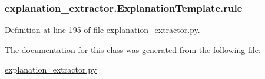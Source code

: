 \subsubsection[{rule}]{\setlength{\rightskip}{0pt plus 5cm}explanation\+\_\+extractor.\+Explanation\+Template.\+rule}\label{classexplanation__extractor_1_1_explanation_template_a4c4f2a6dd654e3aaa157970cc2c7bc21}


Definition at line 195 of file explanation\+\_\+extractor.\+py.



The documentation for this class was generated from the following file\+:\begin{DoxyCompactItemize}
\item 
\hyperlink{explanation__extractor_8py}{explanation\+\_\+extractor.\+py}\end{DoxyCompactItemize}
